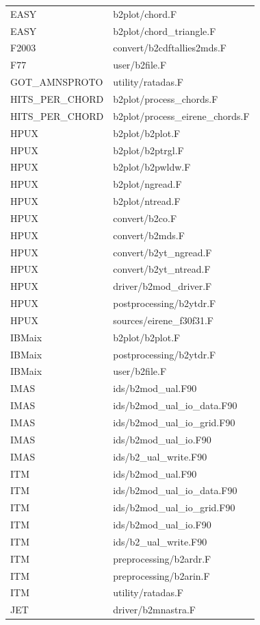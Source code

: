 \documentclass[a4paper,10pt]{report}
\begin{document}
\begin{center}
\begin{longtable}{|l|l|}
EASY & b2plot/chord.F \\
EASY & b2plot/chord\_triangle.F \\
F2003 & convert/b2cdftallies2mds.F \\
F77 & user/b2file.F \\
GOT\_AMNSPROTO & utility/ratadas.F \\
HITS\_PER\_CHORD & b2plot/process\_chords.F \\
HITS\_PER\_CHORD & b2plot/process\_eirene\_chords.F \\
HPUX & b2plot/b2plot.F \\
HPUX & b2plot/b2ptrgl.F \\
HPUX & b2plot/b2pwldw.F \\
HPUX & b2plot/ngread.F \\
HPUX & b2plot/ntread.F \\
HPUX & convert/b2co.F \\
HPUX & convert/b2mds.F \\
HPUX & convert/b2yt\_ngread.F \\
HPUX & convert/b2yt\_ntread.F \\
HPUX & driver/b2mod\_driver.F \\
HPUX & postprocessing/b2ytdr.F \\
HPUX & sources/eirene\_f30f31.F \\
IBMaix & b2plot/b2plot.F \\
IBMaix & postprocessing/b2ytdr.F \\
IBMaix & user/b2file.F \\
IMAS & ids/b2mod\_ual.F90 \\
IMAS & ids/b2mod\_ual\_io\_data.F90 \\
IMAS & ids/b2mod\_ual\_io\_grid.F90 \\
IMAS & ids/b2mod\_ual\_io.F90 \\
IMAS & ids/b2\_ual\_write.F90 \\
ITM & ids/b2mod\_ual.F90 \\
ITM & ids/b2mod\_ual\_io\_data.F90 \\
ITM & ids/b2mod\_ual\_io\_grid.F90 \\
ITM & ids/b2mod\_ual\_io.F90 \\
ITM & ids/b2\_ual\_write.F90 \\
ITM & preprocessing/b2ardr.F \\
ITM & preprocessing/b2arin.F \\
ITM & utility/ratadas.F \\
JET & driver/b2mnastra.F \\

\end{longtable}
\end{center}
\end{document}
